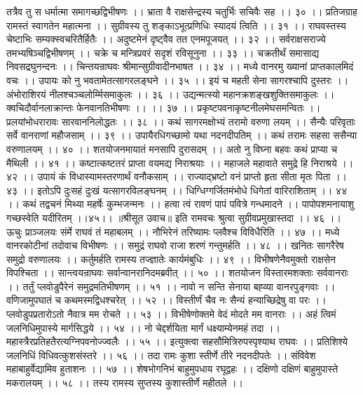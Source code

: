तत्रैव तु स धर्मात्मा समागच्छद्विभीषणः ।।
भ्राता वै राक्षसेन्द्रस्य चतुर्भिः सचिवैः सह ।। ३० ।।
प्रतिजग्राह रामस्तं स्वागतेन महात्मना ।।
सुग्रीवस्य तु शङ्काऽभूत्प्रणिधिः स्यादयं त्विति ।। ३१ ।।
राघवस्तस्य चेष्टाभिः सम्यक्स्वचरितैर्हितैः ।।
अदुष्टमेनं दृष्ट्वैव तत एनमपूजयत् ।। ३२ ।।
सर्वराक्षसराज्ये तमभ्यषिञ्चद्विभीषणम् ।।
चक्रे च मन्त्रिप्रवरं सदृशं रविसूनुना ।। ३३ ।।
चक्रतीर्थं समासाद्य निवसद्रघुनन्दनः ।।
चिन्तयन्राघवः श्रीमान्सुग्रीवादीनभाषत ।। ३४ ।।
मध्ये वानरमु ख्यानां प्राप्तकालमिदं वचः ।।
उपायः को नु भवतामेतत्सागरलङ्घने ।। ३५ ।।
इयं च महती सेना सागरश्चापि दुस्तरः ।।
अंभोराशिरयं नीलश्चञ्चलोर्म्मिसमाकुलः ।। ३६ ।।
उद्यन्मत्स्यो महानक्रशङ्खशुक्तिसमाकुलः ।।
क्वचिदौर्वानलाक्रान्तः फेनवानतिभीषणः ।। ।। ३७ ।।
प्रकृष्टपवनाकृष्टनीलमेघसमन्वितः ।।
प्रलयांभोधरारावः सारवाननिलोद्धतः ।। ३८ ।।
कथं सागरमक्षोभ्यं तरामो वरुणा लयम् ।।
सैन्यैः परिवृताः सर्वे वानराणां महौजसाम् ।। ३९ ।।
उपायैरधिगच्छामो यथा नदनदीपतिम् ।।
कथं तरामः सहसा ससैन्या वरुणालयम् ।। ४० ।।
शतयोजनमायातं मनसापि दुरासदम् ।।
अतो नु विघ्ना बहवः कथं प्राप्या च मैथिली ।। ४१ ।।
कष्टात्कष्टतरं प्राप्ता वयमद्य निराश्रयाः ।।
महाजले महावाते समुद्रे हि निराश्रये ।। ४२ ।।
उपायं कं विधास्यामस्तरणार्थं वनौकसाम् ।।
राज्याद्भ्रष्टो वनं प्राप्तो हृता सीता मृतः पिता ।। ४३ ।।
इतोऽपि दुःसहं दुःखं यत्सागरविलङ्घनम् ।।
धिग्धिग्गर्जितमंभोधे धिगेतां वारिराशिताम् ।। ४४ ।।
कथं तद्वचनं मिथ्या महर्षेः कुम्भजन्मनः ।।
हत्वा त्वं रावणं पापं पवित्रे गन्धमादने ।।
पापोपशमनायाशु गच्छस्वेति यदीरितम् ।।४५।।
॥श्रीसूत उवाच॥
इति रामवचः श्रुत्वा सुग्रीवप्रमुखास्तदा ।। ४६ ।।
ऊचुः प्राञ्जलयः संर्मे राघवं तं महाबलम् ।।
नौभिरेनं तरिष्यामः प्लवैश्च विविधैरिति ।। ४७ ।।
मध्ये वानरकोटीनां तदोवाच विभीषणः ।।
समुद्रं राघवो राजा शरणं गन्तुमर्हति ।। ४८ ।।
खनितः सागरैरेष समुद्रो वरुणालयः ।।
कर्तुमर्हति रामस्य तज्ज्ञातेः कार्यमंबुधिः ।। ४९ ।।
विभीषणेनैवमुक्तो राक्षसेन विपश्चिता ।।
सान्त्वयन्राघवः सर्वान्वानरानिदमब्रवीत् ।। ५० ।।
शतयोजन विस्तारमशक्ताः सर्ववानराः ।।
तर्तुं प्लवोडुपैरेनं समुद्रमतिभीषणम् ।। ५१ ।।
नावो न सन्ति सेनाया बह्व्या वानरपुङ्गवाः ।।
वणिजामुपघातं च कथमस्मद्विधश्चरेत् ।। ५२ ।।
विस्तीर्णं चैव नः सैन्यं हन्याच्छिद्रेषु वा परः ।।
प्लवोडुपप्रतारोऽतो नैवात्र मम रोचते ।। ५३ ।।
विभीषेणोक्तमे वेदं मोदते मम वानराः ।।
अहं त्विमं जलनिधिमुपास्ये मार्गसिद्धये ।। ५४ ।।
नो चेद्दर्शयिता मार्गं धक्ष्याम्येनमहं तदा ।।
महास्त्रैरप्रतिहतैरत्यग्निपवनोज्ज्वलैः ।। ५५ ।।
इत्युक्त्वा सहसौमित्रिरुपस्पृश्याथ राघवः ।।
प्रतिशिश्ये जलनिधिं विधिवत्कुशसंस्तरे ।। ५६ ।।
तदा रामः कुशा स्तीर्णे तीरे नदनदीपतेः ।।
संविवेश महाबाहुर्वेद्यामिव हुताशनः ।। ५७ ।।
शेषभोगनिभं बाहुमुपधाय रघूद्वहः ।।
दक्षिणो दक्षिणं बाहुमुपास्ते मकरालयम् ।। ५८ ।।
तस्य रामस्य सुप्तस्य कुशास्तीर्णे महीतले ।।
